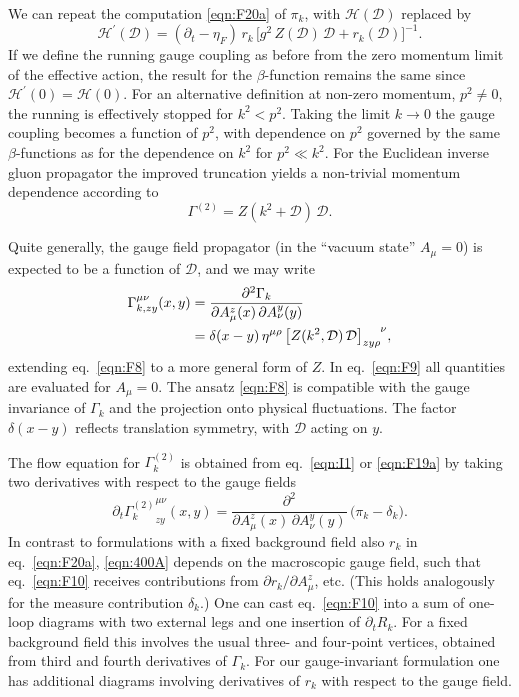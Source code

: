 \documentclass[twocolumn,aps,prd,amsmath,amssymb,preprintnumbers,longbibliography]{revtex4-1}
\numberwithin{equation}{section}
\newenvironment{alignedeqn}{\begin{equation}\begin{aligned}}{\end{aligned}\end{equation}\ignorespacesafterend}
\begin{document}
We can repeat the computation \eqref{eqn:F20a} of $\pi_k$, with $\mathcal{H}(\mathcal{D})$ replaced by
\begin{equation}\label{eqn:F7}
	\mathcal{H}^\prime(\mathcal{D})
	= (\partial_t - \eta_F) \, r_k \, \bigl[g^2 \, Z(\mathcal{D}) \, \mathcal{D} + r_k(\mathcal{D})\bigr]^{-1}.
\end{equation}
If we define the running gauge coupling as before from the zero momentum limit of the effective action, the result for the $\beta$-function remains the same since $\mathcal{H}^\prime(0) = \mathcal{H}(0)$. For an alternative definition at non-zero momentum, $p^2 \neq 0$, the running is effectively stopped for $k^2 < p^2$. Taking the limit $k \to 0$ the gauge coupling becomes a function of $p^2$, with dependence on $p^2$ governed by the same $\beta$-functions as for the dependence on $k^2$ for $p^2 \ll k^2$. For the Euclidean inverse gluon propagator the improved truncation yields a non-trivial momentum dependence according to
\begin{equation}\label{eqn:F8}
	\Gamma^{(2)}
	= Z(k^2 + \mathcal{D}) \, \mathcal{D}.
\end{equation}

Quite generally, the gauge field propagator (in the ``vacuum state'' $A_\mu = 0$) is expected to be a function of $\mathcal{D}$, and we may write
\begin{alignedeqn}\label{eqn:F9}
	\Gamma_{k,zy}^{\mu\nu}(x,y)
	&= \frac{\partial^2 \Gamma_k}{\partial A_\mu^z(x) \, \partial A_\nu^y(y)}\\
	&= \delta(x - y) \, \eta^{\mu\rho} \, \tensor{\bigl[Z(k^2,\mathcal{D}) \, \mathcal{D}\bigr]}{_z_y_\rho^\nu},
\end{alignedeqn}
extending eq.~\eqref{eqn:F8} to a more general form of $Z$. In eq.~\eqref{eqn:F9} all quantities are evaluated for $A_\mu = 0$. The ansatz \eqref{eqn:F8} is compatible with the gauge invariance of $\Gamma_k$ and the projection onto physical fluctuations. The factor $\delta(x - y)$ reflects translation symmetry, with $\mathcal{D}$ acting on $y$.

The flow equation for $\Gamma_k^{(2)}$ is obtained from eq.~\eqref{eqn:I1} or \eqref{eqn:F19a} by taking two derivatives with respect to the gauge fields
\begin{equation}\label{eqn:F10}
	\partial_t {\Gamma_k^{(2)}}_{zy}^{\mu\nu}(x,y)
	= \frac{\partial^2}{\partial A_\mu^z(x) \, \partial A_\nu^y(y)} \, \bigl(\pi_k - \delta_k\bigr).
\end{equation}
In contrast to formulations with a fixed background field also $r_k$ in eq.~\eqref{eqn:F20a}, \eqref{eqn:400A} depends on the macroscopic gauge field, such that eq.~\eqref{eqn:F10} receives contributions from $\partial r_k/\partial A_\mu^z$, etc. (This holds analogously for the measure contribution $\delta_k$.) One can cast eq.~\eqref{eqn:F10} into a sum of one-loop diagrams with two external legs and one insertion of $\partial_t R_k$. For a fixed background field this involves the usual three- and four-point vertices, obtained from third and fourth derivatives of $\Gamma_k$. For our gauge-invariant formulation one has additional diagrams involving derivatives of $r_k$ with respect to the gauge field.
\end{document}
